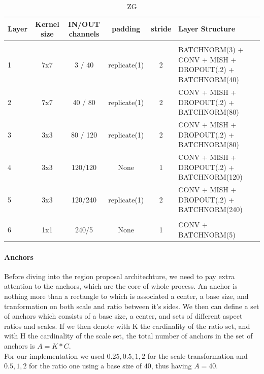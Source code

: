 \documentclass[10pt,journal,cspaper,compsoc]{IEEEtran}
\begin{document}
        \begin{table}[htb]
	\begin{center}
		\caption{ZG}
		\label{tab:Table 1}
		\begin{tabular}{l | c | c | c | c |  l}  
			\textbf{Layer} & \textbf{Kernel size} & \textbf{IN/OUT channels} & \textbf{padding} & \textbf{stride} & \textbf{Layer Structure}\\
			\hline 
			& & & & & \\
			1 & 7x7 & 3 / 40 & replicate(1) & 2 & BATCHNORM(3) + CONV + MISH + DROPOUT(.2) + BATCHNORM(40) \\
			2 & 7x7 & 40 / 80 & replicate(1) & 2 & CONV + MISH + DROPOUT(.2) + BATCHNORM(80) \\
			3 & 3x3 & 80 / 120 & replicate(1) & 2 & CONV + MISH + DROPOUT(.2) + BATCHNORM(80) \\ 
			4 & 3x3 & 120/120 & None & 1 & CONV + MISH + DROPOUT(.2) + BATCHNORM(120)  \\
			5 & 3x3 & 120/240 & replicate(1) & 2 & CONV + MISH + DROPOUT(.2) + BATCHNORM(240) \\
			\hline
			& & & & & \\
			6 & 1x1 & 240/5 & None & 1 & CONV + BATCHNORM(5)
		\end{tabular}
	\end{center}
     \end{table}
    
   \paragraph{Anchors}
    Before diving into the region proposal architechture, we need to pay extra attention to the anchors, which are the core of whole process. An anchor is nothing more than a rectangle to which is associated a center, a base size, and tranformation on both scale and ratio between it's sides. We then can define a set of anchors which consists of a base size, a center, and sets of different 
   aspect ratios and scales. If we then denote with K the cardinality of the ratio set, and with H the cardinality of the scale set, the total number of anchors in the set of anchors is $A = K * C$. \\
   For our implementation we used ${0.25, 0.5, 1, 2}$ for the scale transformation and ${0.5, 1, 2}$ for the ratio one using a base size of $40$, thus having $A = 40$. 
    
\end{document}
